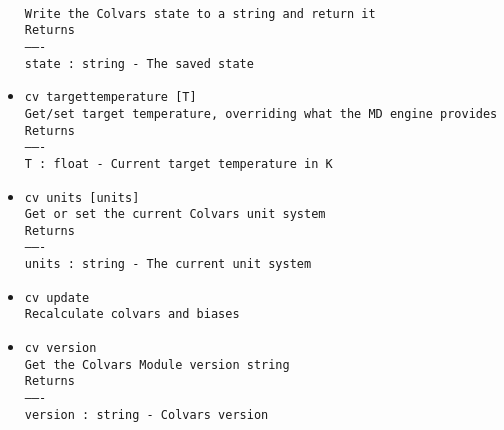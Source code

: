 \begin{itemize}
\\
\texttt{Write the Colvars state to a string and return it}
\\
\texttt{Returns}
\\
\texttt{-------}
\\
\texttt{state : string - The saved state}
\item \texttt{cv targettemperature [T]}
\\
\texttt{Get/set target temperature, overriding what the MD engine provides}
\\
\texttt{Returns}
\\
\texttt{-------}
\\
\texttt{T : float - Current target temperature in K}
\item \texttt{cv units [units]}
\\
\texttt{Get or set the current Colvars unit system}
\\
\texttt{Returns}
\\
\texttt{-------}
\\
\texttt{units : string - The current unit system}
\item \texttt{cv update}
\\
\texttt{Recalculate colvars and biases}
\item \texttt{cv version}
\\
\texttt{Get the Colvars Module version string}
\\
\texttt{Returns}
\\
\texttt{-------}
\\
\texttt{version : string - Colvars version}
\end{itemize}
